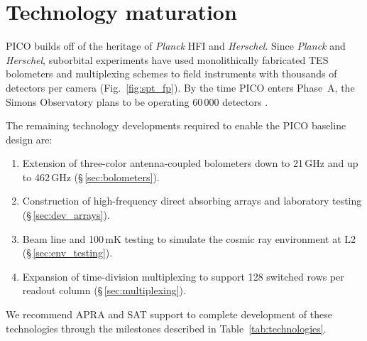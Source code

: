\newpage
\section{Technology maturation}
\label{sec:technology_maturation} %

PICO builds off of the heritage of \textit{Planck} HFI and
\textit{Herschel}.  Since \textit{Planck} and \textit{Herschel},
suborbital experiments have used monolithically fabricated TES
bolometers and multiplexing schemes to field instruments with
thousands of detectors per camera (Fig.~\ref{fig:spt_fp}). By the
time PICO enters Phase~A, the Simons Observatory plans to be operating
60\,000 detectors \citep{Simons2018}.

 The remaining technology developments required to enable the PICO baseline design are:
\begin{enumerate}
\item Extension of three-color antenna-coupled bolometers down to 21\,GHz and up to 462\,GHz (\S\,\ref{sec:bolometers}).
\item Construction of high-frequency direct absorbing arrays and laboratory testing (\S\,\ref{sec:dev_arrays}).
\item Beam line and 100\,mK testing to simulate the cosmic ray environment at L2 (\S\,\ref{sec:env_testing}).
\item Expansion of time-division multiplexing to support 128 switched rows per readout column (\S\,\ref{sec:multiplexing}).
\end{enumerate}
We recommend APRA and SAT support to complete development of these
technologies through the milestones described in Table~\ref{tab:technologies}.





